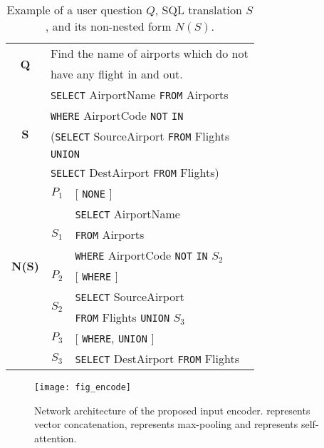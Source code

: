 \documentclass[11pt,a4paper]{article}
\begin{document}
\begin{table}
\centering
\begin{tabular}{|c|c|l|} \hline
\multirow{2}{*}{\textbf{Q}} &\multicolumn{2}{l|}{ Find the name of airports which do not  } \\
&\multicolumn{2}{l|}{have any flight in and out.}\\ \hline
\multirow{5}{*}{\textbf{S}} &\multicolumn{2}{l|}{ \texttt{SELECT} AirportName \texttt{FROM} Airports } \\
&\multicolumn{2}{l|}{ \texttt{WHERE} AirportCode \texttt{NOT} \texttt{IN} } \\
&\multicolumn{2}{l|}{ (\texttt{SELECT} SourceAirport \texttt{FROM} Flights }\\
&\multicolumn{2}{l|}{ \texttt{UNION} } \\
&\multicolumn{2}{l|}{ \texttt{SELECT} DestAirport \texttt{FROM} Flights) }\\ \hline
\multirow{8}{*}{\textbf{N(S)}}&$P_1$&[ \texttt{NONE} ] \\  \cline{2-3}
&\multirow{3}{*}{$S_1$}& \texttt{SELECT} AirportName \\
 & & \texttt{FROM} Airports\\ 
  & & \texttt{WHERE} AirportCode \texttt{NOT} \texttt{IN} $S_2$ \\ \cline{2-3}
&$P_2$& [ \texttt{WHERE} ] \\ \cline{2-3}
&\multirow{2}{*}{$S_2$}&\texttt{SELECT} SourceAirport \\ 
& & \texttt{FROM} Flights \texttt{UNION} $S_3$\\ \cline{2-3}
&$P_3$&[ \texttt{WHERE}, \texttt{UNION} ] \\ \cline{2-3}
&$S_3$&\texttt{SELECT} DestAirport \texttt{FROM} Flights \\ \hline
\end{tabular}
\caption{Example of a user question $Q$, SQL translation $S$, and its non-nested form $N(S)$.}
\label{tbl:ex}
\end{table}

\begin{figure*}
\centering
\texttt{[image: fig\_encode]}
\caption{Network architecture of the proposed input encoder.  represents vector concatenation,  represents max-pooling and  represents self-attention.}
\label{fig:encode}
\end{figure*}
\end{document}
